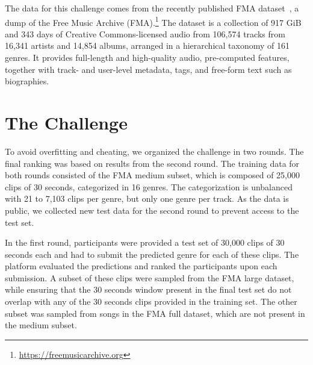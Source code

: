\documentclass[sigconf]{acmart}
\begin{document}
The data for this challenge comes from the recently published FMA dataset~\cite{fma_dataset}, a dump of the Free Music Archive (FMA).\footnote{\url{https://freemusicarchive.org}}
The dataset is a collection of 917 GiB and 343 days of Creative Commons-licensed audio from 106,574 tracks from 16,341 artists and 14,854 albums, arranged in a hierarchical taxonomy of 161 genres.
It provides full-length and high-quality audio, pre-computed features, together with track- and user-level metadata, tags, and free-form text such as biographies.



\section{The Challenge}

To avoid overfitting and cheating, we organized the challenge in two rounds. The final ranking was based on results from the second round.
The training data for both rounds consisted of the FMA medium subset, which is composed of 25,000 clips of 30 seconds, categorized in 16 genres. The categorization is unbalanced with 21 to 7,103 clips per genre, but only one genre per track. As the data is public, we collected new test data for the second round to prevent access to the test set.

In the first round, participants were provided a test set of 30,000 clips of 30 seconds each and had to submit the predicted genre for each of these clips. The platform evaluated the predictions and ranked the participants upon each submission. A subset of these clips were sampled from the FMA large dataset, while ensuring that the 30 seconds window present in the final test set do not overlap with any of the 30 seconds clips provided in the training set. The other subset was sampled from songs in the FMA full dataset, which are not present in the medium subset.
\end{document}
